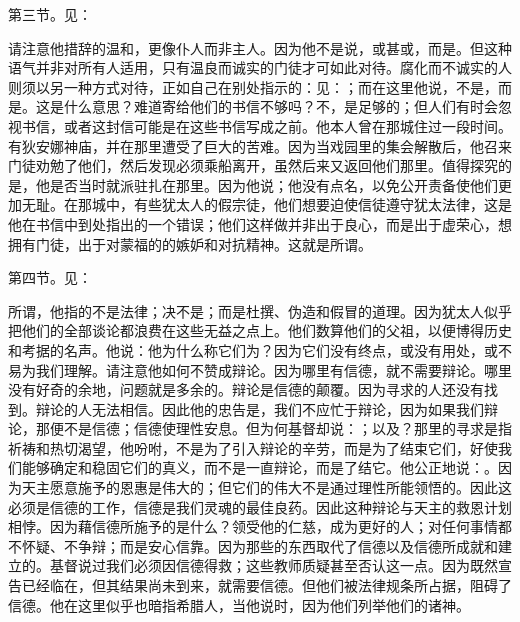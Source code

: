 第三节。见：\par

请注意他措辞的温和，更像仆人而非主人。因为他不是说，或甚或，而是。但这种语气并非对所有人适用，只有温良而诚实的门徒才可如此对待。腐化而不诚实的人则须以另一种方式对待，正如自己在别处指示的：见：；而在这里他说，不是，而是。这是什么意思？难道寄给他们的书信不够吗？不，是足够的；但人们有时会忽视书信，或者这封信可能是在这些书信写成之前。他本人曾在那城住过一段时间。有狄安娜神庙，并在那里遭受了巨大的苦难。因为当戏园里的集会解散后，他召来门徒劝勉了他们，然后发现必须乘船离开，虽然后来又返回他们那里。值得探究的是，他是否当时就派驻扎在那里。因为他说；他没有点名，以免公开责备使他们更加无耻。在那城中，有些犹太人的假宗徒，他们想要迫使信徒遵守犹太法律，这是他在书信中到处指出的一个错误；他们这样做并非出于良心，而是出于虚荣心，想拥有门徒，出于对蒙福的的嫉妒和对抗精神。这就是所谓。\par

第四节。见：\par

所谓，他指的不是法律；决不是；而是杜撰、伪造和假冒的道理。因为犹太人似乎把他们的全部谈论都浪费在这些无益之点上。他们数算他们的父祖，以便博得历史和考据的名声。他说：他为什么称它们为？因为它们没有终点，或没有用处，或不易为我们理解。请注意他如何不赞成辩论。因为哪里有信德，就不需要辩论。哪里没有好奇的余地，问题就是多余的。辩论是信德的颠覆。因为寻求的人还没有找到。辩论的人无法相信。因此他的忠告是，我们不应忙于辩论，因为如果我们辩论，那便不是信德；信德使理性安息。但为何基督却说：；以及？那里的寻求是指祈祷和热切渴望，他吩咐，不是为了引入辩论的辛劳，而是为了结束它们，好使我们能够确定和稳固它们的真义，而不是一直辩论，而是了结它。他公正地说：。因为天主愿意施予的恩惠是伟大的；但它们的伟大不是通过理性所能领悟的。因此这必须是信德的工作，信德是我们灵魂的最佳良药。因此这种辩论与天主的救恩计划相悖。因为藉信德所施予的是什么？领受他的仁慈，成为更好的人；对任何事情都不怀疑、不争辩；而是安心信靠。因为那些的东西取代了信德以及信德所成就和建立的。基督说过我们必须因信德得救；这些教师质疑甚至否认这一点。因为既然宣告已经临在，但其结果尚未到来，就需要信德。但他们被法律规条所占据，阻碍了信德。他在这里似乎也暗指希腊人，当他说时，因为他们列举他们的诸神。\par

